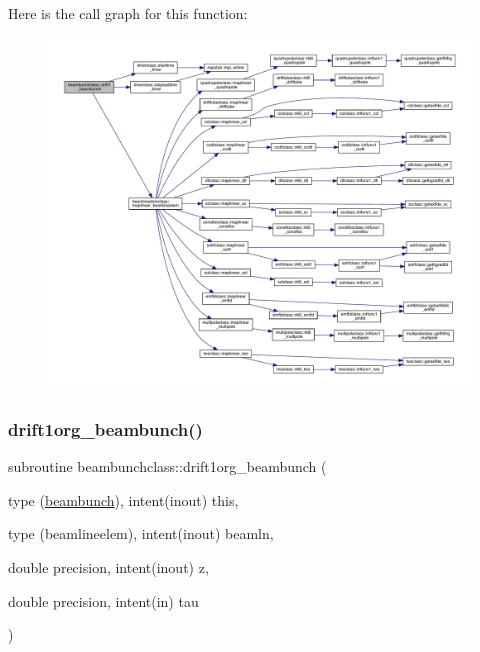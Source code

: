 Here is the call graph for this function\+:\nopagebreak
\begin{figure}[H]
\begin{center}
\leavevmode
\includegraphics[width=350pt]{namespacebeambunchclass_a212c0d38a812d95f238d7da7f29ac17c_cgraph}
\end{center}
\end{figure}
\mbox{\label{namespacebeambunchclass_a3be2b49f0fef567493258758c44fffd6}} 
\subsubsection{\texorpdfstring{drift1org\_beambunch()}{drift1org\_beambunch()}}
{\footnotesize\ttfamily subroutine beambunchclass\+::drift1org\+\_\+beambunch (\begin{DoxyParamCaption}\item[{type (\mbox{\hyperlink{namespacebeambunchclass_structbeambunchclass_1_1beambunch}{beambunch}}), intent(inout)}]{this,  }\item[{type (beamlineelem), intent(inout)}]{beamln,  }\item[{double precision, intent(inout)}]{z,  }\item[{double precision, intent(in)}]{tau }\end{DoxyParamCaption})}




